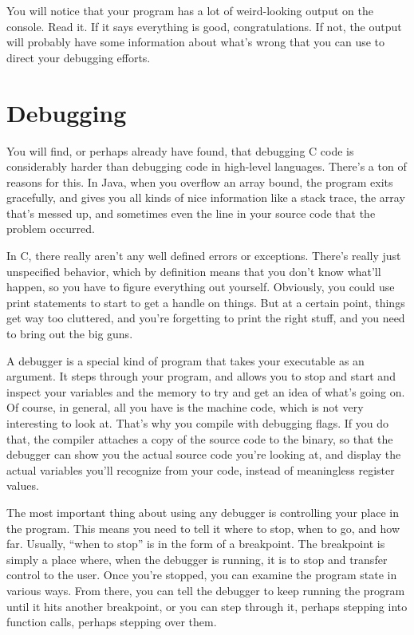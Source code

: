 \documentclass[ebook,11pt,oneside,openany]{memoir}
\begin{document}
You will notice that your program has a lot of weird-looking output on the console. Read it. If it says everything is good, congratulations. If not, the output will probably have some information about what's wrong that you can use to direct your debugging efforts.

\section{Debugging}

You will find, or perhaps already have found, that debugging C code is considerably harder than debugging code in high-level languages. There's a ton of reasons for this. In Java, when you overflow an array bound, the program exits gracefully, and gives you all kinds of nice information like a stack trace, the array that's messed up, and sometimes even the line in your source code that the problem occurred. 

In C, there really aren't any well defined errors or exceptions. There's really just unspecified behavior, which by definition means that you don't know what'll happen, so you have to figure everything out yourself. Obviously, you could use print statements to start to get a handle on things. But at a certain point, things get way too cluttered, and you're forgetting to print the right stuff, and you need to bring out the big guns. 

A debugger is a special kind of program that takes your executable as an argument. It steps through your program, and allows you to stop and start and inspect your variables and the memory to try and get an idea of what's going on. Of course, in general, all you have is the machine code, which is not very interesting to look at. That's why you compile with debugging flags. If you do that, the compiler attaches a copy of the source code to the binary, so that the debugger can show you the actual source code you're looking at, and display the actual variables you'll recognize from your code, instead of meaningless register values.

The most important thing about using any debugger is controlling your place in the program. This means you need to tell it where to stop, when to go, and how far. Usually, ``when to stop'' is in the form of a breakpoint. The breakpoint is simply a place where, when the debugger is running, it is to stop and transfer control to the user. Once you're stopped, you can examine the program state in various ways. From there, you can tell the debugger to keep running the program until it hits another breakpoint, or you can step through it, perhaps stepping into function calls, perhaps stepping over them.
\end{document}

